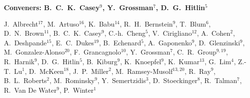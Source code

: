 

\begin{center}

\begin{large} {\bf Conveners: B.~C.~K.~Casey$^{9}$, Y.~Grossman$^{7}$, D.~G.~Hitlin$^{5}$} \end{large}

J.~Albrecht$^{17}$, 
M.~Artuso$^{16}$, 
K.~Babu$^{14}$,
R.~H.~Bernstein$^{9}$,
T.~Blum$^{6}$,
D.~N.~Brown$^{11}$, 
B.~C.~K.~Casey$^{9}$,
C.-h.~Cheng$^{5}$,
V.~Cirigliano$^{12}$,
A.~Cohen$^{2}$,
A.~Deshpande$^{15}$,
E.~C.~Dukes$^{19}$, 
B.~Echenard$^{5}$,
A.~Gaponenko$^{9}$,
D.~Glenzinski$^{9}$,
M.~Gonzalez-Alonso$^{20}$, 
F.~Grancagnolo$^{10}$,
Y.~Grossman$^{7}$,
C.~R.~Group$^{9,19}$,
R.~Harnik$^{9}$,
D.~G.~Hitlin$^{5}$, 
B.~Kiburg$^{9}$,
K.~Knoepfel$^{9}$,
K.~Kumar$^{13}$,
G.~Lim$^{4}$,
Z.-T.~Lu$^{1}$,
D.~McKeen$^{18}$,
J.~P.~Miller$^{2}$,
M.~Ramsey-Musolf$^{13,20}$, 
R.~Ray$^{9}$,
B.~L.~Roberts$^{2}$,
M.~Rominsky$^{9}$,
Y.~Semertzidis$^{3}$,
D.~Stoeckinger$^{8}$,
R.~Talman$^{7}$,
R.~Van De Water$^{9}$,
P.~Winter$^{1}$ 


\end{center}




